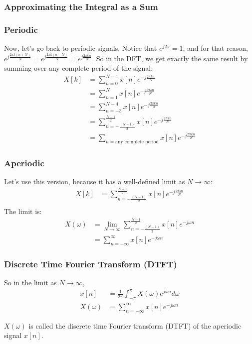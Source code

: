 \documentclass{beamer}
\begin{document}
\begin{frame}
  \frametitle{Approximating the Integral as a Sum}

  \centerline{}
\end{frame}

\begin{frame}
  \frametitle{Periodic}

  Now, let's go back to periodic signals.  Notice that
  $e^{j2\pi}=1$, and for that reason, $e^{j\frac{2\pi
      k(n+N)}{N}}=e^{j\frac{2\pi k(n-N)}{N}}=e^{j\frac{2\pi kn}{N}}$.
  So in the DFT, we get exactly the same result by summing over any
  complete period of the signal:
  \begin{align*}
    X[k] &= \sum_{n=0}^{N-1} x[n] e^{-j\frac{2\pi kn}{N}}\\
    &= \sum_{n=1}^{N} x[n] e^{-j\frac{2\pi kn}{N}}\\
    &= \sum_{n=-3}^{N-4} x[n] e^{-j\frac{2\pi kn}{N}}\\
    &= \sum_{n=-\frac{(N-1)}{2}}^{\frac{N-1}{2}} x[n] e^{-j\frac{2\pi kn}{N}}\\
    &= \sum_{n=\mbox{any complete period}} x[n] e^{-j\frac{2\pi kn}{N}}
  \end{align*}
\end{frame}

\begin{frame}
  \frametitle{Aperiodic}

  Let's use this version, because it has a well-defined limit as
  $N\rightarrow\infty$:
  \begin{align*}
    X[k] &= \sum_{n=-\frac{(N-1)}{2}}^{\frac{N-1}{2}} x[n] e^{-j\frac{2\pi kn}{N}}\\
  \end{align*}
  The limit is:
  \begin{align*}
    X(\omega) &= \lim_{N\rightarrow\infty}\sum_{n=-\frac{(N-1)}{2}}^{\frac{N-1}{2}} x[n] e^{-j\omega n}\\
    &= \sum_{n=-\infty}^{\infty} x[n] e^{-j\omega n}
  \end{align*}
\end{frame}

\begin{frame}
  \frametitle{Discrete Time Fourier Transform (DTFT)}

  So in the limit as $N\rightarrow\infty$,
  \begin{align*}
    x[n] &= \frac{1}{2\pi}\int_{-\pi}^\pi X(\omega)e^{j\omega n}d\omega\\
    X(\omega) &= \sum_{n=-\infty}^\infty x[n]e^{-j\omega n}
  \end{align*}

  $X(\omega)$ is called the discrete time Fourier transform (DTFT)  of the
  aperiodic signal $x[n]$.
\end{frame}
\end{document}
